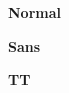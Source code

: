 \documentclass[a4paper]{article}
\begin{document}
\textbf{Normal}

\lipsum[1]

\textbf{Sans}

\textsf{\lipsum[1]}

\textbf{TT}

\texttt{\lipsum[1]}
\end{document}
